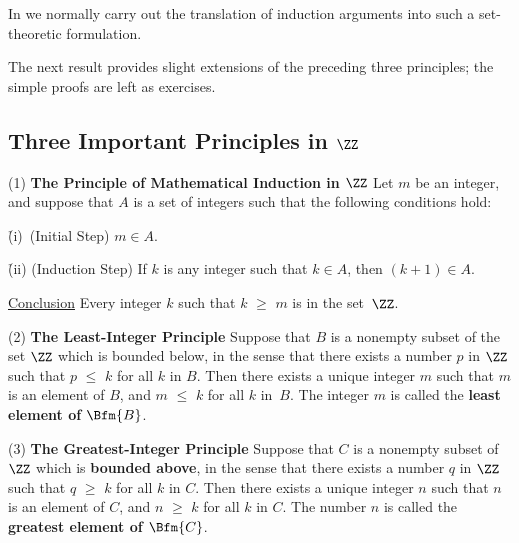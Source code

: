 {        In {\ThisText} we normally carry out the translation of induction arguments into such a set-theoretic formulation.

\VV

        The next result provides slight extensions of the preceding three principles; the simple proofs are left as exercises. %

\VV



            \subsection{\small{\bf Three Important Principles in ${\ZZ}$}}
            \label{PrinA10.11B}

\V

\hspace*{\parindent} (1) {\bf The Principle of Mathematical Induction in ${\ZZ}$}
    Let $m$ be an integer, and suppose that $A$ is a set of integers such that the following conditions hold:

        \h (i)\, (Initial Step) $m{\in}A$.

        \h (ii) (Induction Step) If $k$ is any integer such that $k{\in}A$, then $(k+1){\in}A$.

\noindent \underline{Conclusion} Every integer $k$ such that $k\,\,{\geq}\,\,m$ is in the set~${\ZZ}$.

\V

        (2) {\bf The Least-Integer Principle}
    Suppose that $B$ is a nonempty subset of the set ${\ZZ}$ which is bounded below,
    in the sense that there exists a number $p$ in ${\ZZ}$ such that $p\,\,{\leq}\,\,k$ for all $k$ in $B$.
    Then there exists a unique integer $m$ such that $m$ is an element of $B$, and $m\,\,{\leq}\,\,k$ for all $k$ in~$B$.
    The integer $m$ is called the {\bf least element of $\Bfm{B}$}.

\V

        (3) {\bf The Greatest-Integer Principle}
    Suppose that $C$ is a nonempty subset of ${\ZZ}$ which is {\bf bounded above},
    in the sense that there exists a number $q$ in ${\ZZ}$ such that $q\,\,{\geq}\,\,k$ for all $k$ in $C$.
    Then there exists a unique integer $n$ such that $n$ is an element of $C$, and $n\,\,{\geq}\,\,k$ for all $k$ in $C$.
    The number $n$ is called the {\bf greatest element of $\Bfm{C}$}.


}

